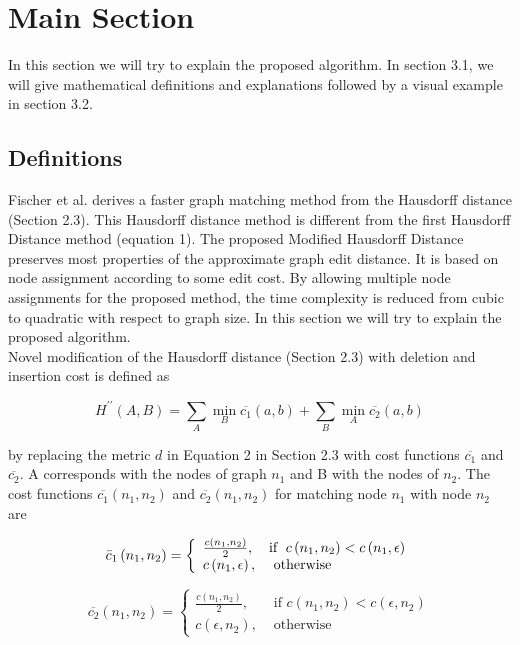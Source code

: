 \documentclass{article}
\begin{document}
\section{Main Section}
In this section we will try to explain the proposed algorithm. In section 3.1, we will give mathematical definitions and explanations followed by a visual example in section 3.2.


\subsection{Definitions}
Fischer et al. derives a faster graph matching method from the Hausdorff distance (Section 2.3). This Hausdorff distance method is different from the first Hausdorff Distance method (equation 1). The proposed Modified Hausdorff Distance preserves most properties of the approximate graph edit distance. It is based on node assignment according to some edit cost. By allowing multiple node assignments for the proposed method, the time complexity is reduced from cubic to quadratic with respect to graph size. In this section we will try to explain the proposed algorithm. \\

Novel modification of the Hausdorff distance (Section 2.3) with deletion and insertion cost is defined as 


\begin{equation}
H^{\prime \prime}(A, B)=\sum_{A} \min _{B} \overline{c_{1}}(a, b)+\sum_{B} \min _{A} \overline{c_{2}}(a, b)
\end{equation}

by replacing the metric $d$ in Equation 2 in Section 2.3 with cost functions $\overline{c_{1}}$ and $\overline{c_{2}}$. A corresponds with the nodes of graph $n_1$ and B with the nodes of $n_2$. The cost functions $\overline{c_{1}}(n_1,n_2)$ and $\overline{c_{2}}(n_1,n_2)$ for matching node $n_1$ with node $n_2$ are 

\begin{equation}
\bar{c}_{1}\left(n_{1}, n_{2}\right)=\left\{\begin{array}{ll}\frac{c\left(n_{1}, n_{2}\right)}{2}, & \text {if \;}  c\left(n_{1}, n_{2}\right)<c\left(n_{1}, \epsilon\right) \\ c\left(n_{1}, \epsilon\right), & \text { otherwise }\end{array}\right. 
\end{equation}

\begin{equation}
\overline{c_{2}}\left(n_{1}, n_{2}\right)=\left\{\begin{array}{ll}\frac{c\left(n_{1}, n_{2}\right)}{2}, & \text { if } c\left(n_{1}, n_{2}\right)<c\left(\epsilon, n_{2}\right) \\ c\left(\epsilon, n_{2}\right), & \text { otherwise }\end{array}\right.
\end{equation}
\end{document}
